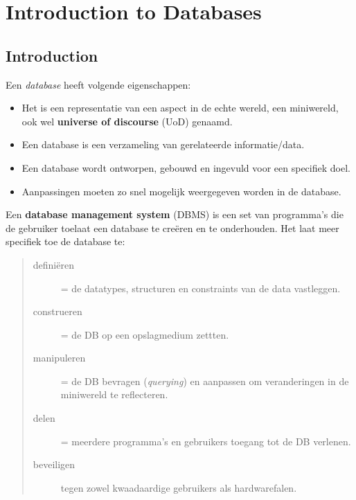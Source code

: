 \chapter{Introduction to Databases}

\section{Introduction}

Een \textit{database} heeft volgende eigenschappen:
\begin{itemize}
 \item Het is een representatie van een aspect in de echte wereld, een miniwereld, ook wel \textbf{universe of discourse} (UoD)  genaamd.
 \item Een database is een verzameling van gerelateerde informatie/data.
 \item Een database wordt ontworpen, gebouwd en ingevuld voor een specifiek doel.
 \item Aanpassingen moeten zo snel mogelijk weergegeven worden in de database.
\end{itemize}
Een \textbf{database management system} (DBMS) is een set van programma's die de gebruiker toelaat een database te cre\"eren en te onderhouden. Het laat meer specifiek toe de database te:

\begin{quote} %
\begin{description}
	\item[defini\"eren] = de datatypes, structuren en constraints van de data vastleggen.
	\item[construeren] = de DB op een opslagmedium zettten.
	\item[manipuleren] = de DB bevragen (\textit{querying}) en aanpassen om veranderingen in de miniwereld te reflecteren.
	\item[delen] = meerdere programma's en gebruikers toegang tot de DB verlenen.
	\item[beveiligen] tegen zowel kwaadaardige gebruikers als hardwarefalen. 
\end{description}
\end{quote}

